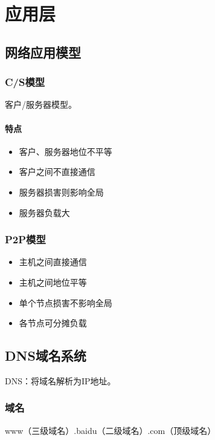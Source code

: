 
\chapter{应用层}

\section{网络应用模型}

\subsection{C/S模型}
客户/服务器模型。

\subsubsection{特点}
\begin{itemize}
    \item 客户、服务器地位不平等
    \item 客户之间不直接通信
    \item 服务器损害则影响全局
    \item 服务器负载大
\end{itemize}


\subsection{P2P模型}
\begin{itemize}
    \item 主机之间直接通信
    \item 主机之间地位平等
    \item 单个节点损害不影响全局
    \item 各节点可分摊负载
\end{itemize}


\section{DNS域名系统}
DNS：将域名解析为IP地址。

\subsection{域名}
www（三级域名）.baidu（二级域名）.com（顶级域名）

